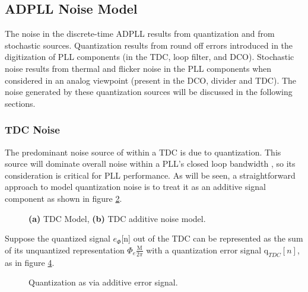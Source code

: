 \subsection{ADPLL Noise Model} \label{pn_theory}
The noise in the discrete-time ADPLL results from quantization and from stochastic sources. Quantization results from round off errors introduced in the digitization of PLL components (in the TDC, loop filter, and DCO). Stochastic noise results from thermal and flicker noise in the PLL components when considered in an analog viewpoint (present in the DCO, divider and TDC). The noise generated by these quantization sources will be discussed in the following sections.%

\subsubsection{TDC Noise}\label{tdc_noise}
	The predominant noise source of within a TDC is due to quantization. This source will dominate overall noise within a PLL's closed loop bandwidth \cite{shen_2014}\cite{takinami_2011}\cite{lu_andreani_2010}, so its consideration is critical for PLL performance. As will be seen, a straightforward approach to model quantization noise is to treat it as an additive signal component as shown in figure \ref{fig:tdc_add_pn}.
	\begin{figure}[htb!]
	    \centering
	    \begin{subfigure}{0.5\textwidth}
	        \centering
	        
	        \caption{ }
	        \label{fig:tdc1}
	    \end{subfigure}%
	    \begin{subfigure}{0.5\textwidth}
	        \centering
	        
	        \caption{ }
	        \label{fig:tdc_add_pn}
	    \end{subfigure}
	    \label{fig:tdc_pn_model}
	    \caption{\textbf{(a)} TDC Model, \textbf{(b)} TDC additive noise model.}
	\end{figure}
	\FloatBarrier
	Suppose the quantized signal $e_\Phi$[n] out of the TDC can be represented as the sum of its unquantized representation $\Phi_e\frac{\mathrm{M}}{2\pi}$ with a quantization error signal $\mathrm{q}_{TDC}[n]$, as in figure \ref{fig:quantization}.
	\begin{figure}[htb!]
		\center
		\caption{Quantization as via additive error signal.}
		\label{fig:quantization}
	\end{figure}
